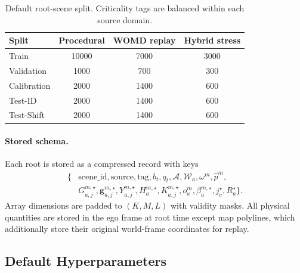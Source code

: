 \documentclass[conference]{IEEEtran}
\begin{document}
\begin{table}[t]
\centering
\caption{Default root-scene split.  Criticality tags are balanced within each source domain.}
\label{tab:app_dataset_split_new}
\begin{tabular}{lccc}
\toprule
Split & Procedural & WOMD replay & Hybrid stress \\
\midrule
Train & 10000 & 7000 & 3000 \\
Validation & 1000 & 700 & 300 \\
Calibration & 2000 & 1400 & 600 \\
Test-ID & 2000 & 1400 & 600 \\
Test-Shift & 2000 & 1400 & 600 \\
\bottomrule
\end{tabular}
\end{table}

\paragraph{Stored schema.}
Each root is stored as a compressed record with keys
\begin{equation}
\label{eq:app_schema_new}
\begin{split}
\{&\mathrm{scene\_id},\mathrm{source},\mathrm{tag},b_t,q_t,\mathcal A,\mathcal W_a,\omega^m,
\widehat p^m,\\
& G_{a,j}^{m,\star},\bm g_{a,j}^{m,\star},Y_{a,j}^{m,\star},H_a^{m,\star},K_{a,j}^{m,\star},o_a^m,\beta_a^{m,\star},j_{c}^\star,R_a^\star\}.
\end{split}
\end{equation}
Array dimensions are padded to $(K,M,L)$ with validity masks.  All physical quantities are stored in the ego frame at root time except map polylines, which additionally store their original world-frame coordinates for replay.

\subsection{Default Hyperparameters}
\label{app:hyperparameters_new}
\end{document}
